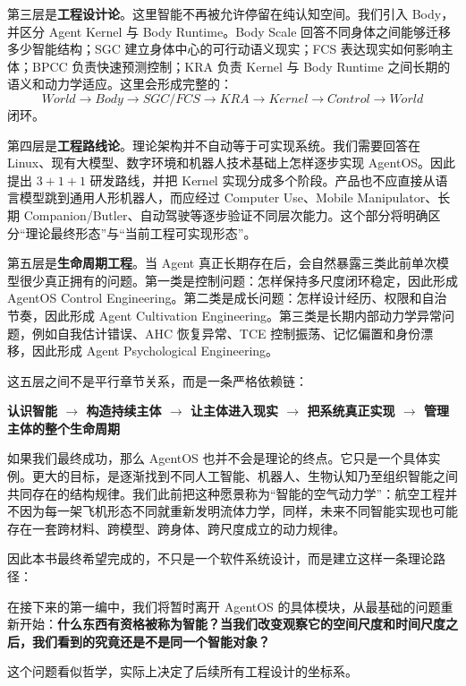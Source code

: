 第三层是\textbf{工程设计论}。这里智能不再被允许停留在纯认知空间。我们引入 Body，并区分 Agent Kernel 与 Body Runtime。Body Scale 回答不同身体之间能够迁移多少智能结构；SGC 建立身体中心的可行动语义现实；FCS 表达现实如何影响主体；BPCC 负责快速预测控制；KRA 负责 Kernel 与 Body Runtime 之间长期的语义和动力学适应。这里会形成完整的：
\[
World
\rightarrow
Body
\rightarrow
SGC/FCS
\rightarrow
KRA
\rightarrow
Kernel
\rightarrow
Control
\rightarrow
World
\]
闭环。

第四层是\textbf{工程路线论}。理论架构并不自动等于可实现系统。我们需要回答在 Linux、现有大模型、数字环境和机器人技术基础上怎样逐步实现 AgentOS。因此提出 $3+1+1$ 研发路线，并把 Kernel 实现分成多个阶段。产品也不应直接从语言模型跳到通用人形机器人，而应经过 Computer Use、Mobile Manipulator、长期 Companion/Butler、自动驾驶等逐步验证不同层次能力。这个部分将明确区分“理论最终形态”与“当前工程可实现形态”。

第五层是\textbf{生命周期工程}。当 Agent 真正长期存在后，会自然暴露三类此前单次模型很少真正拥有的问题。第一类是控制问题：怎样保持多尺度闭环稳定，因此形成 AgentOS Control Engineering。第二类是成长问题：怎样设计经历、权限和自治节奏，因此形成 Agent Cultivation Engineering。第三类是长期内部动力学异常问题，例如自我估计错误、AHC 恢复异常、TCE 控制振荡、记忆偏置和身份漂移，因此形成 Agent Psychological Engineering。

这五层之间不是平行章节关系，而是一条严格依赖链：
\begin{statementbox}
\centering\bfseries
认识智能
$\longrightarrow$
构造持续主体
$\longrightarrow$
让主体进入现实
$\longrightarrow$
把系统真正实现
$\longrightarrow$
管理主体的整个生命周期
\end{statementbox}

如果我们最终成功，那么 AgentOS 也并不会是理论的终点。它只是一个具体实例。更大的目标，是逐渐找到不同人工智能、机器人、生物认知乃至组织智能之间共同存在的结构规律。我们此前把这种愿景称为“智能的空气动力学”：航空工程并不因为每一架飞机形态不同就重新发明流体力学，同样，未来不同智能实现也可能存在一套跨材料、跨模型、跨身体、跨尺度成立的动力规律。

因此本书最终希望完成的，不只是一个软件系统设计，而是建立这样一条理论路径：
\begin{statementbox}
\centering
{}
\end{statementbox}

在接下来的第一编中，我们将暂时离开 AgentOS 的具体模块，从最基础的问题重新开始：\textbf{什么东西有资格被称为智能？当我们改变观察它的空间尺度和时间尺度之后，我们看到的究竟还是不是同一个智能对象？}

这个问题看似哲学，实际上决定了后续所有工程设计的坐标系。
